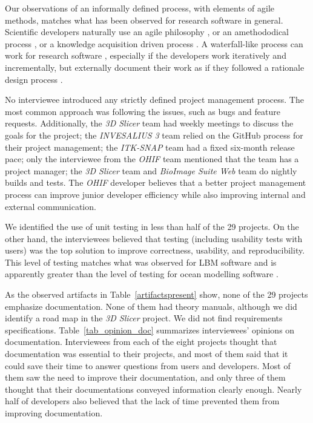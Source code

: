 \documentclass[final, 12pt, 3p, times]{elsarticle}
\begin{document}
Our observations of an informally defined process, with elements of agile
methods, matches what has been observed for research software in general.
Scientific developers naturally use an agile philosophy \cite{AckroydEtAl2008,
CarverEtAl2007, EasterbrookAndJohns2009, Segal2005, HeatonAndCarver2015}, or an
amethododical process \cite{Kelly2013}, or a knowledge acquisition driven
process \cite{Kelly2015}.  A waterfall-like process can work for research
software \cite{Smith2016}, especially if the developers work iteratively and
incrementally, but externally document their work as if they followed a
rationale design process \cite{parnas1986rational}.

No interviewee introduced any strictly defined project management process. The
most common approach was following the issues, such as bugs and feature
requests. Additionally, the \textit{3D Slicer} team had weekly meetings to
discuss the goals for the project; the \textit{INVESALIUS 3} team relied on the
GitHub process for their project management; the \textit{ITK-SNAP} team had a
fixed six-month release pace; only the interviewee from the \textit{OHIF} team
mentioned that the team has a project manager; the \textit{3D Slicer} team and
\textit{BioImage Suite Web} team do nightly builds and tests. The \textit{OHIF}
developer believes that a better project management process can improve junior
developer efficiency while also improving internal and external communication.

We identified the use of unit testing in less than half of the 29 projects. On
the other hand, the interviewees believed that testing (including usability
tests with users) was the top solution to improve correctness, usability, and
reproducibility.  This level of testing matches what was observed for LBM
software \cite{Michalski2021} and is apparently greater than the level of
testing for ocean modelling software \cite{JungEtAl2022}.

As the observed artifacts in Table~\ref{artifactspresent} show, none of the 29
projects emphasize documentation. None of them had theory manuals, although we
did identify a road map in the \textit{3D Slicer} project.  We did not find
requirements specifications. Table~\ref{tab_opinion_doc} summarizes
interviewees' opinions on documentation. Interviewees from each of the eight
projects thought that documentation was essential to their projects, and most of
them said that it could save their time to answer questions from users and
developers. Most of them saw the need to improve their documentation, and only
three of them thought that their documentations conveyed information clearly
enough. Nearly half of developers also believed that the lack of time prevented
them from improving documentation.
\end{document}
